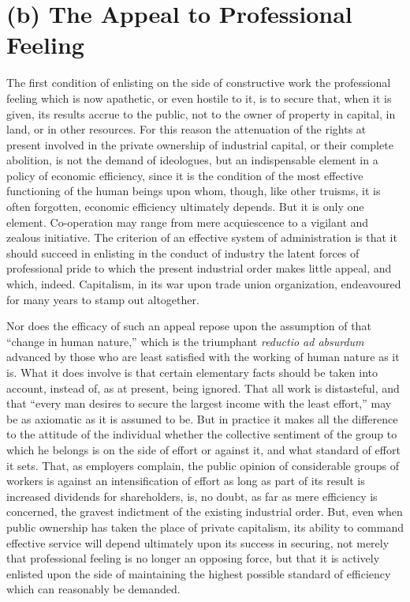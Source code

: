\documentclass{book}
\begin{document}
\section{(b) The Appeal to Professional Feeling}
The first condition of enlisting on the side of constructive work the professional feeling which is now apathetic, or even hostile to it, is to secure that, when it is given, its results accrue to the public, not to the owner of property in capital, in land, or in other resources. For this reason the attenuation of the rights at present involved in the private ownership of industrial capital, or their complete abolition, is not the demand of ideologues, but an indispensable element in a policy of economic efficiency, since it is the condition of the most effective functioning of the human beings upon whom, though, like other truisms, it is often forgotten, economic efficiency ultimately depends. But it is only one element. Co-operation may range from mere acquiescence to a vigilant and zealous initiative. The criterion of an effective system of administration is that it should succeed in enlisting in the conduct of industry the latent forces of professional pride to which the present industrial order makes little appeal, and which, indeed. Capitalism, in its war upon trade union organization, endeavoured for many years to stamp out altogether.

Nor does the efficacy of such an appeal repose upon the assumption of that “change in human nature,” which is the triumphant \emph{reductio ad absurdum} advanced by those who are least satisfied with the working of human nature as it is. What it does involve is that certain elementary facts should be taken into account, instead of, as at present, being ignored. That all work is distasteful, and that “every man desires to secure the largest income with the least effort,” may be as axiomatic as it is assumed to be. But in practice it makes all the difference to the attitude of the individual whether the collective sentiment of the group to which he belongs is on the side of effort or against it, and what standard of effort it sets. That, as employers complain, the public opinion of considerable groups of workers is against an intensification of effort as long as part of its result is increased dividends for shareholders, is, no doubt, as far as mere efficiency is concerned, the gravest indictment of the existing industrial order. But, even when public ownership has taken the place of private capitalism, its ability to command effective service will depend ultimately upon its success in securing, not merely that professional feeling is no longer an opposing force, but that it is actively enlisted upon the side of maintaining the highest possible standard of efficiency which can reasonably be demanded.
\end{document}
